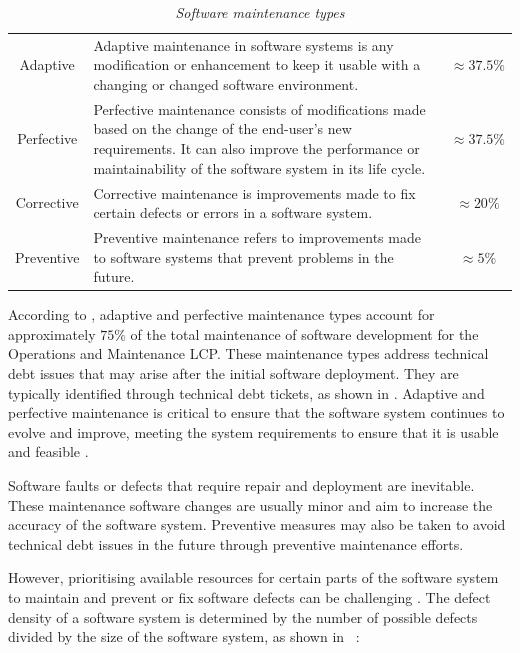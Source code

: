 \begin{table}[!htb]
	\centering
	\caption[Software maintenance types]
	{\textit{Software maintenance types \cite{Ping2010,Hasan2012}}}
	\label{tbl:ch1_maintenanceTypes}
	\begin{tabularx}{\textwidth}{cXc}
		\toprule
		\thead{Maintenance type} & \thead{Description} & \thead{$\%$ of maintenance activities} \\ 
		\midrule

		\rowcolor{lightgray}
		Adaptive & \raggedright Adaptive maintenance in software systems is any modification or enhancement to keep it usable with a changing or changed software environment. & $\approx 37.5\%$ \\ 

		Perfective & \raggedright Perfective maintenance consists of modifications made based on the change of the end-user's new requirements. It can also improve the performance or maintainability of the software system in its life cycle. & $\approx 37.5\%$ \\ 
		
		\rowcolor{lightgray}
		Corrective & \raggedright Corrective maintenance is improvements made to fix certain defects or errors in a software system. & $\approx 20\%$ \\ 

		\rowcolor{lightgray}
		Preventive & \raggedright  Preventive maintenance refers to improvements made to software systems that prevent problems in the future. & $\approx 5\%$ \\ 
		\bottomrule
	\end{tabularx}
\end{table}

According to , adaptive and perfective maintenance types account for approximately $75\%$ of the total maintenance of software development for the Operations and Maintenance LCP. These maintenance types address technical debt issues that may arise after the initial software deployment. They are typically identified through technical debt tickets, as shown in . Adaptive and perfective maintenance is critical to ensure that the software system continues to evolve and improve, meeting the system requirements to ensure that it is usable and feasible \cite{Kumar2013}.\par Software faults or defects that require repair and deployment are inevitable. These maintenance software changes are usually minor and aim to increase the accuracy of the software system. Preventive measures may also be taken to avoid technical debt issues in the future through preventive maintenance efforts. \par However, prioritising available resources for certain parts of the software system to maintain and prevent or fix software defects can be challenging \cite{Mamone1994, Hasan2012}. The defect density of a software system is determined by the number of possible defects divided by the size of the software system, as shown in ~\cite{Rahmani2010}:


